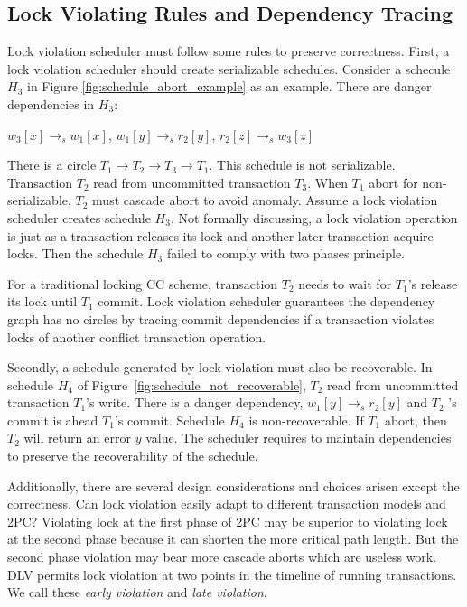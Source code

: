 \documentclass[conference]{IEEEtran}
\begin{document}
\subsection{Lock Violating Rules and Dependency Tracing}

Lock violation scheduler must follow some rules to preserve correctness.
First, a lock violation scheduler should create serializable schedules.
Consider a schecule ${H_3}$ in Figure \ref{fig:schedule_abort_example} as an example.
There are danger dependencies in ${H_3}$:

\begin{center}
  ${w_3[x] \rightarrow _s w_1[x]}$, 
${w_1[y] \rightarrow _s r_2[y]}$,
${r_2[z] \rightarrow _s w_3[z]}$
\end{center}

There is a circle ${T_1 \rightarrow T_2 \rightarrow T_3 \rightarrow T_1}$.
This schedule is not serializable.
Transaction ${T_2}$
read from uncommitted transaction ${T_3}$.
When ${T_1}$ abort for non-serializable, ${T_2}$ must cascade abort to avoid anomaly.
Assume a lock violation scheduler creates schedule ${H_3}$.
Not formally discussing, a lock violation operation is just as a transaction releases its lock and another later transaction acquire locks.
Then the schedule ${H_3}$ failed to comply with two phases principle.

For a traditional locking CC scheme, transaction ${T_2}$ needs to wait for ${T_1}$'s release its lock until ${T_1}$ commit.
Lock violation scheduler guarantees the dependency graph has no circles by tracing commit dependencies if a transaction violates locks of another conflict transaction operation. 

Secondly, a schedule generated by lock violation must also be recoverable.
In schedule ${H_4}$ of Figure~\ref{fig:schedule_not_recoverable}, 
${T_2}$ read from uncommitted transaction ${T_1}$'s write.
There is a danger dependency, ${w_1[y] \rightarrow_s r_2[y]}$ and ${T_2}$ 's commit is ahead ${T_1}$'s commit.
Schedule ${H_4}$ is non-recoverable.
If ${T_1}$ abort, then ${T_2}$ will return an error ${y}$ value.
The scheduler requires to maintain dependencies to preserve the recoverability of the schedule. 


Additionally, there are several design considerations and choices arisen except the correctness.
Can lock violation easily adapt to different transaction models and 2PC?
Violating lock at the first phase of 2PC may be superior to violating lock at the second phase because it can shorten the more critical path length.
But the second phase violation may bear more cascade aborts which are useless work.
DLV permits lock violation at two points in the timeline of running transactions.
We call these \emph{early violation} and \emph{late violation}.
\end{document}
